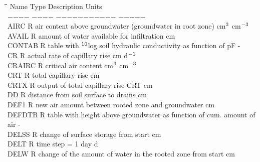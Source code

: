 \documentclass[11pt]{article}
\begin{document}
\begin{tabbing}
\hspace{1.27cm}\=\hspace{1.27cm}\=\hspace{1.27cm}\=\hspace{1.27cm}\=%
\hspace{1.27cm}\=\hspace{1.27cm}\=\hspace{1.27cm}\=\hspace{1.27cm}\=%
\hspace{1.27cm}\=\hspace{1.27cm}\=\kill
Name    \> \> Type   \> Description                                        \> \> \> \> \> \> \> Units\\
$-$$-$$-$$-$    \> \> $-$$-$$-$$-$   \> $-$$-$$-$$-$$-$$-$$-$$-$$-$$-$$-$                                        \> \> \> \> \> \> \> $-$$-$$-$$-$$-$\\
AIRC\> \> R\> air content above groundwater (groundwater in root zone)\> \> \> \> \> \> \> cm$^{{\rm 3}}$ cm$^{{\rm -3}}$\\
AVAIL\> \> R\> amount of water available for infiltration\> \> \> \> \> \> \> cm\\
CONTAB\> \> R\> table with $^{{\rm 10}}$log soil hydraulic conductivity as function of pF \> \> \> \> \> \> \> -\\
CR\> \> R\> actual rate of capillary rise\> \> \> \> \> \> \> cm d$^{{\rm -1}}$\\
CRAIRC\> \> R\> critical air content\> \> \> \> \> \> \> cm$^{{\rm 3}}$ cm$^{{\rm -3}}$\\
CRT\> \> R\> total capillary rise\> \> \> \> \> \> \> cm\\
CRTX\> \> R\> output of total capillary rise CRT\> \> \> \> \> \> \> cm\\
DD\> \> R\> distance from soil surface to drains\> \> \> \> \> \> \> cm\\
DEF1\> \> R\> new air amount between rooted zone and groundwater\> \> \> \> \> \> \> cm\\
DEFDTB\> \> R\> table with height above groundwater as function of cum. amount of air\> \> \> \> \> \> \> -\\
DELSS\> \> R\> change of surface storage from start\> \> \> \> \> \> \> cm\\
DELT\> \> R\> time step = 1 day\> \> \> \> \> \> \> d\\
DELW\> \> R\> change of the amount of water in the rooted zone from start\> \> \> \> \> \> \> cm\\

\end{tabbing}
\end{document}
